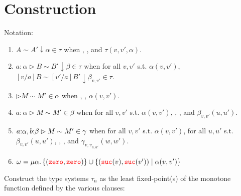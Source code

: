 \newcommand{\sameType}[4]{\ensuremath{#1 \sim #2 \downarrow #3 \in #4}}
\newcommand{\sameTypeOne}[6]{\ensuremath{\isOf{#1}{#2} \rhd #3 \sim #4 \downarrow #5 \in #6}}
\newcommand{\sameComp}[4]{\ensuremath{#1 \rhd #2 \sim #3 \in #4}}
\newcommand{\equivComp}[3]{\ensuremath{#1 \RHD #2 \asymp #3}}
\newcommand{\CComp}[4]{\ensuremath{\diamond #1 \rhd #2 \in #3 \diamond #4}}
\newcommand{\CCompOne}[6]
{\ensuremath{\isOf{#1}{#2} \diamond #3  \rhd #4 \in #5 \diamond #6}}

\newcommand{\type}[1]{\mathtt{Type}_{#1}}
\newcommand{\term}{\mathsf{Term}}
\newcommand{\evalTo}[1]{{#1}^{\Downarrow}}
\newcommand{\class}[1]{\ensuremath{[#1]}}
\newcommand{\cost}[1]{\ensuremath{\mathcal{C}}(#1)}
\newcommand{\fequiv}[2]{\ensuremath{#1 \asymp #2}}
\newcommand{\arrabt}[3]{\ensuremath{\Pi(#1; #2)}}
\newcommand{\relpot}[4]{\ensuremath{\mathtt{relpot}(#1.#2; #3.#4)}}
\newcommand{\relpotty}[3]{\ensuremath{\mathtt{relpotty}(#1;#2.#3)}}
\section{Construction}

Notation:

\begin{enumerate}
  \item $A \sim A' \downarrow \alpha \in \tau$ when , , and 
  $\tau(v,v',\alpha)$.
  \item $a : \alpha \rhd B \sim B' \downarrow \beta \in \tau$ when 
  for all $v,v'$ s.t. $\alpha(v,v')$, \sameType{[v/a]B}{[v'/a]B'}{\beta_{v,v'}}{\tau}.
\item \sameComp{}{M}{M'}{\alpha} when , , $\alpha(v,v')$.
  \item $a : \alpha \rhd M \sim M' \in \beta$ when 
  for all $v,v'$ s.t. $\alpha(v,v')$, 
  , , and $\beta_{v,v'}(u,u')$.
\item \sameComp{\isOf{a}{\alpha}, \isOf{b}{\beta}}{M}{M'}{\gamma} when 
  for all $v,v'$ s.t. $\alpha(v,v')$, 
  for all $u,u'$ s.t. $\beta_{v,v'}(u,u')$, 
  , , and $\gamma_{{v,v}_{u,u'}}(w,w')$.
  \item $\omega = \mu \alpha.\, \{({\color{red}{\mathtt{zero}}},{\color{red}{\mathtt{zero}}})\} \cup \{({\color{red}{\mathtt{suc}}}(v),{\color{red}{\mathtt{suc}}}(v')) \mid \alpha(v,v')\}$
\end{enumerate}

Construct the type systems $\tau_n$ as the least fixed-point(s) of the 
monotone function defined by the various clauses: 

